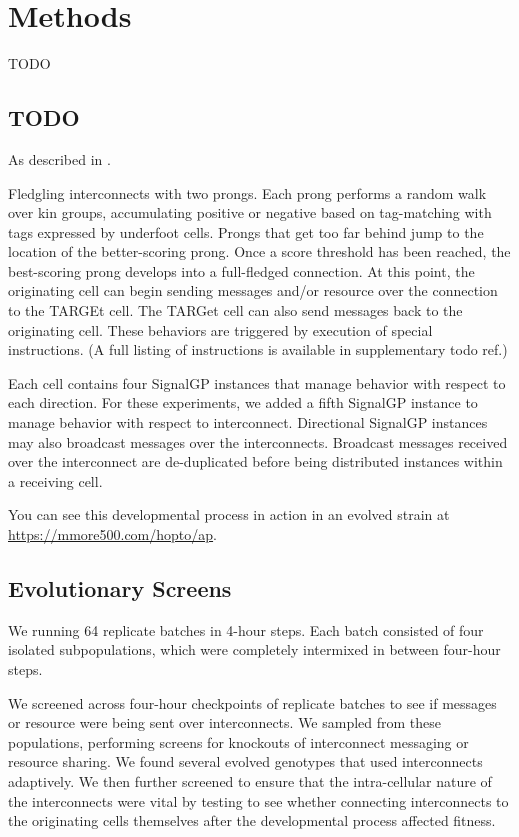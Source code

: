 \section{Methods}

TODO

\subsection{TODO}


As described in \citep{TODOcitedishtinygp}.

Fledgling interconnects with two prongs.
Each prong performs a random walk over kin groups, accumulating positive or negative based on tag-matching with tags expressed by underfoot cells.
Prongs that get too far behind jump to the location of the better-scoring prong.
Once a score threshold has been reached, the best-scoring prong develops into a full-fledged connection.
At this point, the originating cell can begin sending messages and/or resource over the connection to the TARGEt cell.
The TARGet cell can also send messages back to the originating cell.
These behaviors are triggered by execution of special instructions.
(A full listing of instructions is available in supplementary todo ref.)

Each cell contains four SignalGP instances that manage behavior with respect to each direction.
For these experiments, we added a fifth SignalGP instance to manage behavior with respect to interconnect.
Directional SignalGP instances may also broadcast messages over the interconnects.
Broadcast messages received over the interconnect are de-duplicated before being distributed instances within a receiving cell.

You can see this developmental process in action in an evolved strain at \url{https://mmore500.com/hopto/ap}.





\subsection{Evolutionary Screens}

We running 64 replicate batches in 4-hour steps.
Each batch consisted of four isolated subpopulations, which were completely intermixed in between four-hour steps.

We screened across four-hour checkpoints of replicate batches to see if messages or resource were being sent over interconnects.
We sampled from these populations, performing screens for knockouts of interconnect messaging or resource sharing.
We found several evolved genotypes that used interconnects adaptively.
We then further screened to ensure that the intra-cellular nature of the interconnects were vital by testing to see whether connecting interconnects to the originating cells themselves after the developmental process affected fitness.

